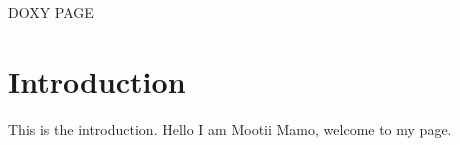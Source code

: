 D\+O\+XY P\+A\+GE \hypertarget{index_intro_sec}{}\section{Introduction}\label{index_intro_sec}
This is the introduction. Hello I am Mootii Mamo, welcome to my page. 
